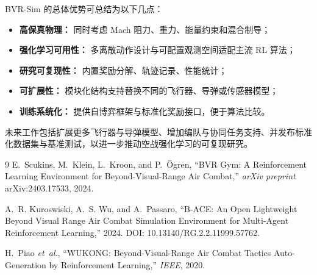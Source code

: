 \documentclass[11pt,a4paper]{article}
\begin{document}
BVR-Sim 的总体优势可总结为以下几点：
\begin{itemize}
    \item \textbf{高保真物理：} 同时考虑 Mach 阻力、重力、能量约束和混合制导；
    \item \textbf{强化学习可用性：} 多离散动作设计与可配置观测空间适配主流 RL 算法；
    \item \textbf{研究可复现性：} 内置奖励分解、轨迹记录、性能统计；
    \item \textbf{可扩展性：} 模块化结构支持替换不同的飞行器、导弹或传感器模型；
    \item \textbf{训练系统化：} 提供自博弈框架与标准化奖励接口，便于算法比较。
\end{itemize}

未来工作包括扩展更多飞行器与导弹模型、增加编队与协同任务支持、并发布标准化数据集与基准测试，以进一步推动空战强化学习的可复现研究。

\begin{thebibliography}{9}
E.~Scukins, M.~Klein, L.~Kroon, and P.~\"Ogren, ``BVR Gym: A Reinforcement Learning Environment for Beyond-Visual-Range Air Combat,'' \emph{arXiv preprint} arXiv:2403.17533, 2024.

A.~R. Kuroswiski, A.~S. Wu, and A.~Passaro, ``B-ACE: An Open Lightweight Beyond Visual Range Air Combat Simulation Environment for Multi-Agent Reinforcement Learning,'' 2024. DOI: 10.13140/RG.2.2.11999.57762.

H.~Piao \emph{et~al.}, ``WUKONG: Beyond-Visual-Range Air Combat Tactics Auto-Generation by Reinforcement Learning,'' \emph{IEEE}, 2020.
\end{thebibliography}
\end{document}
